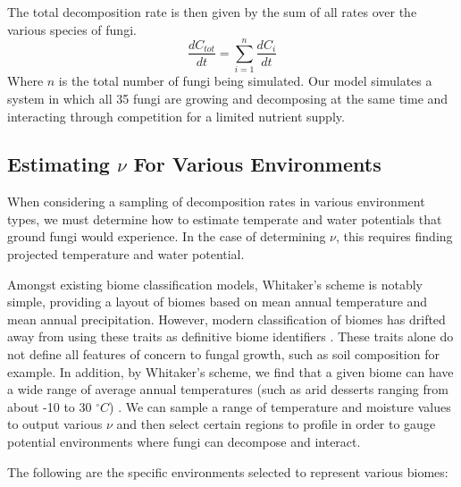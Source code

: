 \documentclass[12pt]{article}
\begin{document}
\begin{multicols}{2}
The total decomposition rate is then given by the sum of all rates over the various species of fungi.
\begin{equation} \label{eq}
\frac{dC_{tot}}{dt} = \sum_{i=1}^{n}\frac{dC_{i}}{dt}
\end{equation}
Where $n$ is the total number of fungi being simulated. Our model simulates a system in which all 35 fungi are growing and decomposing at the same time and interacting through competition for a limited nutrient supply.

\subsection{Estimating $\nu$ For Various Environments}\label{Environments Conditions}

When considering a sampling of decomposition rates in various environment types, we must determine how to estimate temperate and water potentials that ground fungi would experience. In the case of determining $\nu$, this requires finding projected temperature and water potential.

Amongst existing biome classification models, Whitaker's scheme \cite{Whittaker1970} is notably simple, providing a layout of biomes based on mean annual temperature and mean annual precipitation. However, modern classification of biomes has drifted away from using these traits as definitive biome identifiers \cite{Mucina2018}. These traits alone do not define all features of concern to fungal growth, such as soil composition for example. In addition, by Whitaker's scheme, we find that a given biome can have a wide range of average annual temperatures (such as arid desserts ranging from about -10 to 30 $^{\circ}C$) \cite{Whittaker1970}. We can sample a range of temperature and moisture values to output various $\nu$ and then select certain regions to profile in order to gauge potential environments where fungi can decompose and interact.

The following are the specific environments selected to represent various biomes:

\end{multicols}
\end{document}
